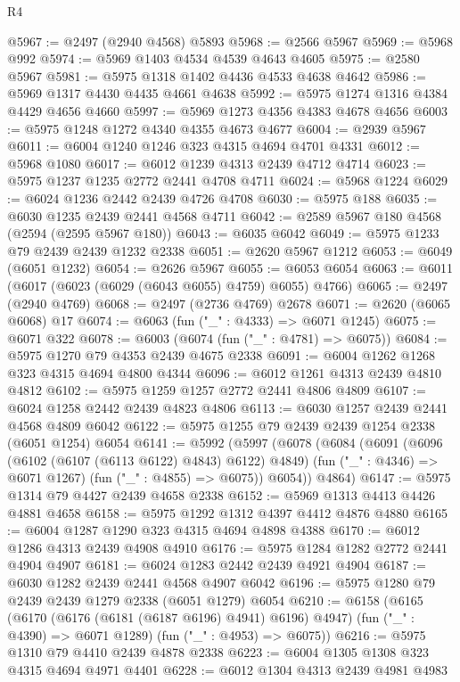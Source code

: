 \begin{lexlean}{R4}
\begin{coremodule}
@5967 := @2497 (@2940 @4568) @5893
@5968 := @2566 @5967
@5969 := @5968 @992
@5974 := @5969 @1403 @4534 @4539 @4643 @4605
@5975 := @2580 @5967
@5981 := @5975 @1318 @1402 @4436 @4533 @4638 @4642
@5986 := @5969 @1317 @4430 @4435 @4661 @4638
@5992 := @5975 @1274 @1316 @4384 @4429 @4656 @4660
@5997 := @5969 @1273 @4356 @4383 @4678 @4656
@6003 := @5975 @1248 @1272 @4340 @4355 @4673 @4677
@6004 := @2939 @5967
@6011 := @6004 @1240 @1246 @323 @4315 @4694 @4701 @4331
@6012 := @5968 @1080
@6017 := @6012 @1239 @4313 @2439 @4712 @4714
@6023 := @5975 @1237 @1235 @2772 @2441 @4708 @4711
@6024 := @5968 @1224
@6029 := @6024 @1236 @2442 @2439 @4726 @4708
@6030 := @5975 @188
@6035 := @6030 @1235 @2439 @2441 @4568 @4711
@6042 := @2589 @5967 @180 @4568 (@2594 (@2595 @5967 @180))
@6043 := @6035 @6042
@6049 := @5975 @1233 @79 @2439 @2439 @1232 @2338
@6051 := @2620 @5967 @1212
@6053 := @6049 (@6051 @1232)
@6054 := @2626 @5967
@6055 := @6053 @6054
@6063 := @6011 (@6017 (@6023 (@6029 (@6043 @6055) @4759) @6055) @4766)
@6065 := @2497 (@2940 @4769)
@6068 := @2497 (@2736 @4769) @2678
@6071 := @2620 (@6065 @6068) @17
@6074 := @6063 (fun ("_" : @4333) => @6071 @1245)
@6075 := @6071 @322
@6078 := @6003 (@6074 (fun ("_" : @4781) => @6075))
@6084 := @5975 @1270 @79 @4353 @2439 @4675 @2338
@6091 := @6004 @1262 @1268 @323 @4315 @4694 @4800 @4344
@6096 := @6012 @1261 @4313 @2439 @4810 @4812
@6102 := @5975 @1259 @1257 @2772 @2441 @4806 @4809
@6107 := @6024 @1258 @2442 @2439 @4823 @4806
@6113 := @6030 @1257 @2439 @2441 @4568 @4809 @6042
@6122 := @5975 @1255 @79 @2439 @2439 @1254 @2338 (@6051 @1254) @6054
@6141 := @5992
    (@5997
      (@6078
        (@6084
          (@6091
            (@6096 (@6102 (@6107 (@6113 @6122) @4843) @6122) @4849)
            (fun ("_" : @4346) => @6071 @1267)
            (fun ("_" : @4855) => @6075))
          @6054))
      @4864)
@6147 := @5975 @1314 @79 @4427 @2439 @4658 @2338
@6152 := @5969 @1313 @4413 @4426 @4881 @4658
@6158 := @5975 @1292 @1312 @4397 @4412 @4876 @4880
@6165 := @6004 @1287 @1290 @323 @4315 @4694 @4898 @4388
@6170 := @6012 @1286 @4313 @2439 @4908 @4910
@6176 := @5975 @1284 @1282 @2772 @2441 @4904 @4907
@6181 := @6024 @1283 @2442 @2439 @4921 @4904
@6187 := @6030 @1282 @2439 @2441 @4568 @4907 @6042
@6196 := @5975 @1280 @79 @2439 @2439 @1279 @2338 (@6051 @1279) @6054
@6210 := @6158
    (@6165
      (@6170 (@6176 (@6181 (@6187 @6196) @4941) @6196) @4947)
      (fun ("_" : @4390) => @6071 @1289)
      (fun ("_" : @4953) => @6075))
@6216 := @5975 @1310 @79 @4410 @2439 @4878 @2338
@6223 := @6004 @1305 @1308 @323 @4315 @4694 @4971 @4401
@6228 := @6012 @1304 @4313 @2439 @4981 @4983

\end{coremodule}
\end{lexlean}
